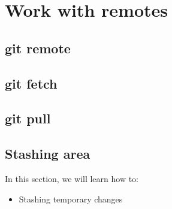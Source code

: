 \section{Work with remotes}
\begin{frame}[fragile]
    \slidetitle
\end{frame}

\subsection{git remote}
\begin{frame}[fragile]
    \subslidetitle
\end{frame}

\subsection{git fetch}
\begin{frame}[fragile]
    \subslidetitle
\end{frame}

\subsection{git pull}
\begin{frame}[fragile]
    \subslidetitle
\end{frame}

\subsection{Stashing area}
\begin{frame}[fragile]
  \slidetitle

  In this section, we will learn how to:
  \begin{itemize}
    \item Stashing temporary changes
  \end{itemize}
\end{frame}



